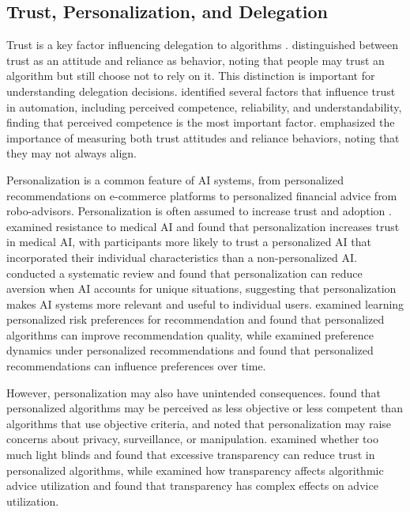 \subsection{Trust, Personalization, and Delegation}

Trust is a key factor influencing delegation to algorithms \citep{lee2004, kohn2021}. \citet{lee2004} distinguished between trust as an attitude and reliance as behavior, noting that people may trust an algorithm but still choose not to rely on it. This distinction is important for understanding delegation decisions. \citet{hoff2015} identified several factors that influence trust in automation, including perceived competence, reliability, and understandability, finding that perceived competence is the most important factor. \citet{kohn2021} emphasized the importance of measuring both trust attitudes and reliance behaviors, noting that they may not always align.

Personalization is a common feature of AI systems, from personalized recommendations on e-commerce platforms to personalized financial advice from robo-advisors. Personalization is often assumed to increase trust and adoption \citep{longoni2019, jussupow2020}. \citet{longoni2019} examined resistance to medical AI and found that personalization increases trust in medical AI, with participants more likely to trust a personalized AI that incorporated their individual characteristics than a non-personalized AI. \citet{jussupow2020} conducted a systematic review and found that personalization can reduce aversion when AI accounts for unique situations, suggesting that personalization makes AI systems more relevant and useful to individual users. \citet{ge2020} examined learning personalized risk preferences for recommendation and found that personalized algorithms can improve recommendation quality, while \citet{dean2022} examined preference dynamics under personalized recommendations and found that personalized recommendations can influence preferences over time.

However, personalization may also have unintended consequences. \citet{castelo2019} found that personalized algorithms may be perceived as less objective or less competent than algorithms that use objective criteria, and \citet{hoff2015} noted that personalization may raise concerns about privacy, surveillance, or manipulation. \citet{hu2024} examined whether too much light blinds and found that excessive transparency can reduce trust in personalized algorithms, while \citet{ning2024} examined how transparency affects algorithmic advice utilization and found that transparency has complex effects on advice utilization.

